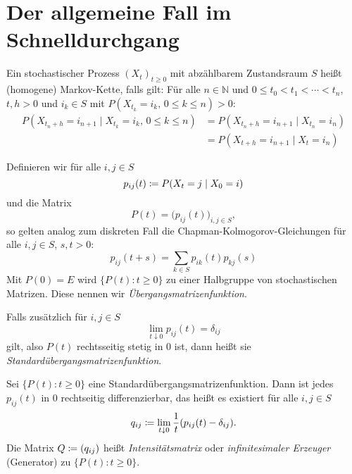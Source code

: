 \documentclass[a4paper,twoside,DIV15,BCOR12mm]{scrbook}
\begin{document}
\section{Der allgemeine Fall im Schnelldurchgang}

\begin{definition}
Ein stochastischer Prozess $(X_t)_{t\ge 0}$ mit abzählbarem Zustandsraum $S$ heißt (homogene) Markov-Kette, falls gilt:
Für alle $n\in\mathbb N$ und $0\le t_0 < t_1 < \cdots < t_n$, $t,h>0$ und $i_k\in S$ mit $P(X_{t_k}=i_k,\, 0\le k\le n) > 0$:
\begin{align*}
P(X_{t_n+h}=i_{n+1} \mid X_{t_k}=i_k,\, 0\le k\le n) &= P(X_{t_n+h} = i_{n+1} \mid X_{t_n} = i_n) \\ 
&= P(X_{t+h} = i_{n+1} \mid X_t=i_n)
\end{align*}
\end{definition}

\begin{bemerkung}
Definieren wir für alle $i,j\in S$
\[
p_{ij}(t) \da P(X_t = j \mid X_0 = i)
\]
und die Matrix
\[
P(t) = \big(p_{ij}(t)\big)_{i,j\in S},
\]
so gelten analog zum diskreten Fall die Chapman-Kolmogorov-Gleichungen für alle $i,j\in S$, $s,t>0$:
\[
p_{ij}(t+s) = \sum_{k\in S} p_{ik}(t) p_{kj}(s)
\]
Mit $P(0)=E$ wird $\{P(t): t\ge 0\}$ zu einer Halbgruppe von stochastischen Matrizen. Diese nennen wir \emph{Übergangsmatrizenfunktion}.

Falls zusätzlich für $i,j\in S$ 
\[
\lim_{t\downarrow 0} p_{ij}(t)=\delta_{ij}
\]
gilt, also $P(t)$ rechtsseitig stetig in $0$ ist, dann heißt sie \emph{Standardübergangsmatrizenfunktion}.
\end{bemerkung}


\begin{satzunddefinition}
Sei $\{P(t): t\ge 0\}$ eine Standardübergangsmatrizenfunktion. Dann ist jedes $p_{ij}(t)$ in 0 rechtseitig differenzierbar, das heißt es existiert für alle $i,j\in S$
\[
q_{ij} \da \lim_{t\downarrow 0} \frac 1t (p_{ij}(t) - \delta_{ij}).
\]
Die Matrix $Q\da (q_{ij})$ heißt \emph{Intensitätsmatrix} oder \emph{infinitesimaler Erzeuger} (Generator) zu $\{P(t): t\ge 0\}$.
\end{satzunddefinition}
\end{document}
